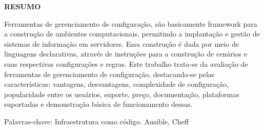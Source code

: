 
\begin{newpage}
	\thispagestyle{empty}
	\setlength{\baselineskip}{1.5\baselineskip} %
	\begin{center}
		\textbf{RESUMO} \\ [1.5\baselineskip]
	\end{center}
	\singlespace
	\noindent 
	
	
	Ferramentas de gerenciamento de configuração, são basicamente framework para a construção de ambientes computacionais, permitindo a implantação e gestão de sistemas de informação em servidores. Essa construção é dada por meio de linguagens declarativas, através de instruções para a construção de cenários e suas respectivas configurações e regras.
    Este trabalho trata-se da avaliação de ferramentas de gerenciamento de configuração, destacando-se pelas características: vantagens, desvantagens, complexidade de configuração, popularidade entre os usuários, suporte, preço, documentação, plataformas suportadas e demonstração básica de funcionamento dessas.

        \vspace{1.5\baselineskip} 
	\par
        \noindent Palavras-chave: {Infraestrutura como código. Ansible, Cheff }%
\end{newpage}


